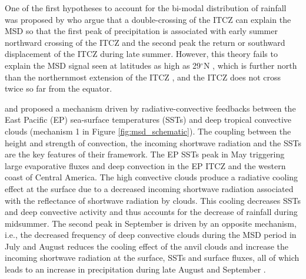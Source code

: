 
One of the first hypotheses to account for the bi-modal distribution of rainfall was proposed by \cite{hastenrath1967} who argue that a double-crossing of the ITCZ can explain the MSD so that the first peak of precipitation is associated with early summer northward crossing of the ITCZ and the second peak the return or southward displacement of the ITCZ during late summer.
However, this theory fails to explain the MSD signal seen at latitudes as high as 29$^\circ$N \citep{perdigon2018,zhao2020}, which is further north than the northernmost extension of the ITCZ \citep{schneider2014}, and the ITCZ does not cross twice so far from the equator. %

\cite{magana1999} and \cite{magana2005} proposed a mechanism driven by radiative-convective feedbacks between the East Pacific (EP) sea-surface temperatures (SSTs) and deep tropical convective clouds (mechanism 1 in Figure \ref{fig:msd_schematic}). The coupling between the height and strength of convection, the incoming shortwave radiation and the SSTs are the key features of their framework. %
The EP SSTs peak in May triggering large evaporative fluxes and deep convection in the EP ITCZ and the western coast of Central America.
The high convective clouds produce a radiative cooling effect at the surface due to a decreased incoming shortwave radiation associated with the reflectance of shortwave radiation by clouds.
This cooling  decreases SSTs and deep convective activity and thus accounts for the decrease of rainfall during midsummer.
The second peak in September is driven by an opposite mechanism, i.e., the decreased frequency of deep convective clouds during the MSD period in July and August reduces the cooling effect of the anvil clouds and increase the incoming shortwave radiation at the surface, SSTs and surface fluxes, all of which leads to an increase in precipitation during late August and September \citep{magana1999}.


